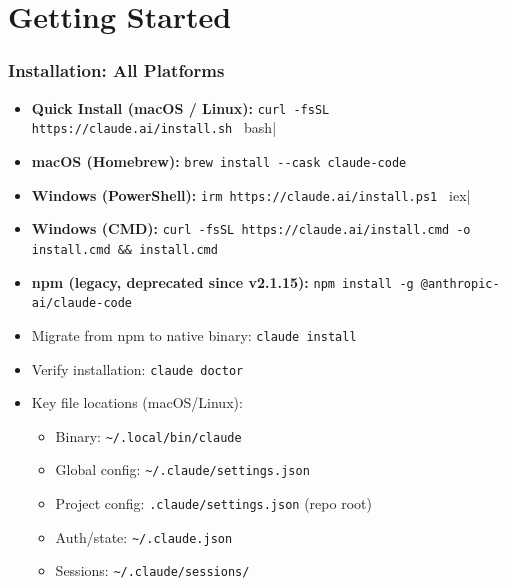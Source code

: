 \section{Getting Started}
\begin{frame}[fragile]\frametitle{Installation: All Platforms}
  \begin{itemize}
    \item \textbf{Quick Install (macOS / Linux):}
    \lstinline|curl -fsSL https://claude.ai/install.sh | bash|
    \item \textbf{macOS (Homebrew):}
    \lstinline|brew install --cask claude-code|
    \item \textbf{Windows (PowerShell):}
    \lstinline|irm https://claude.ai/install.ps1 | iex|
    \item \textbf{Windows (CMD):}
    \lstinline|curl -fsSL https://claude.ai/install.cmd -o install.cmd && install.cmd|
    \item \textbf{npm (legacy, deprecated since v2.1.15):}
    \lstinline|npm install -g @anthropic-ai/claude-code|
    \item Migrate from npm to native binary: \lstinline|claude install|
    \item Verify installation: \lstinline|claude doctor|
    \item Key file locations (macOS/Linux):
      \begin{itemize}
        \item Binary: \lstinline|~/.local/bin/claude|
        \item Global config: \lstinline|~/.claude/settings.json|
        \item Project config: \lstinline|.claude/settings.json| (repo root)
        \item Auth/state: \lstinline|~/.claude.json|
        \item Sessions: \lstinline|~/.claude/sessions/|
      \end{itemize}
  \end{itemize}
\end{frame}


